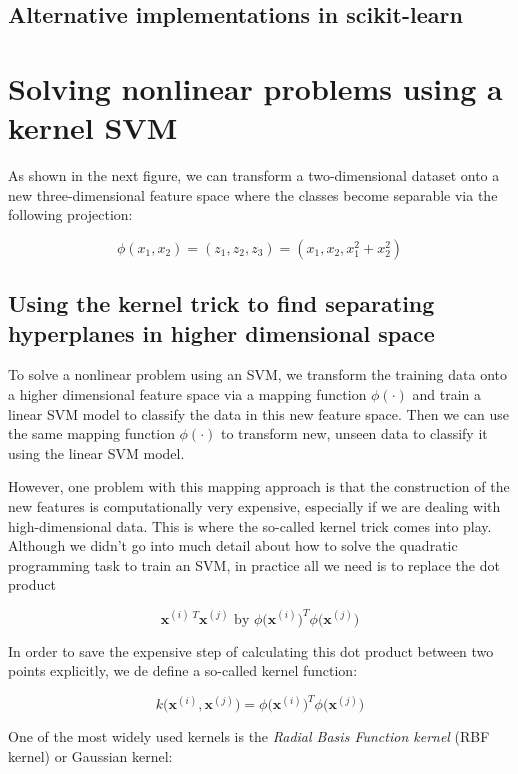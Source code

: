 \documentclass[letterpaper]{report}
\begin{document}
\subsection{Alternative implementations in scikit-learn}
\section{Solving nonlinear problems using a kernel SVM}

As shown in the next  figure, we can transform a two-dimensional dataset onto a new three-dimensional feature space where the classes become separable via the following projection:

\[
\phi(x_1, x_2) = (z_1, z_2, z_3) = (x_1, x_2, x_{1}^{2} + x_{2}^{2})
\]

\subsection{Using the kernel trick to find separating hyperplanes in higher dimensional space}

To solve a nonlinear problem using an SVM, we transform the training data onto a higher dimensional feature space via a mapping function $\phi(\cdot)$ and train a linear SVM model to classify the data in this new feature space. Then we can use the same mapping function $\phi(\cdot)$ to transform new, unseen data to classify it using the linear SVM model.

However, one problem with this mapping approach is that the construction of the new features is computationally very expensive, especially if we are dealing with high-dimensional data. This is where the so-called kernel trick comes into play. Although we didn't go into much detail about how to solve the quadratic programming task to train an SVM, in practice all we need is to replace the dot product 

\[
\mathbf{x}^{(i) \; T} \mathbf{x}^{(j)} \text{ by } \phi \big( \mathbf{x}^{(i)} \big)^T \phi \big( \mathbf{x}^{(j)} \big)
\]


In order to save the expensive step of calculating this dot product between two points explicitly, we de define a so-called kernel function:

\[
k \big( \mathbf{x}^{(i)}, \mathbf{x}^{(j)}  \big) = \phi \big( \mathbf{x}^{(i)} \big)^T \phi \big( \mathbf{x}^{(j)} \big)
\]

One of the most widely used kernels is the \textit{Radial Basis Function kernel} (RBF kernel) or Gaussian kernel:
\end{document}
